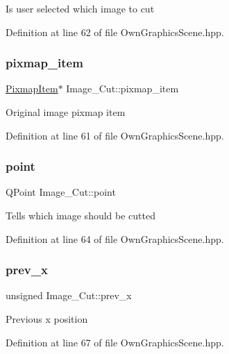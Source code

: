 Is user selected which image to cut 

Definition at line 62 of file Own\+Graphics\+Scene.\+hpp.

\mbox{\label{structImage__Cut_afdafc46c968b35b63758d409ef863a8f}} 
\subsubsection{\texorpdfstring{pixmap\+\_\+item}{pixmap\_item}}
{\footnotesize\ttfamily \mbox{\hyperlink{classPixmapItem}{Pixmap\+Item}}$\ast$ Image\+\_\+\+Cut\+::pixmap\+\_\+item}

Original image pixmap item 

Definition at line 61 of file Own\+Graphics\+Scene.\+hpp.

\mbox{\label{structImage__Cut_a45fc996285a5ae8ef255d66655d63df2}} 
\subsubsection{\texorpdfstring{point}{point}}
{\footnotesize\ttfamily Q\+Point Image\+\_\+\+Cut\+::point}

Tells which image should be cutted 

Definition at line 64 of file Own\+Graphics\+Scene.\+hpp.

\mbox{\label{structImage__Cut_a9e6768e7bea9a60876d086d78da3c4df}} 
\subsubsection{\texorpdfstring{prev\+\_\+x}{prev\_x}}
{\footnotesize\ttfamily unsigned Image\+\_\+\+Cut\+::prev\+\_\+x}

Previous x position 

Definition at line 67 of file Own\+Graphics\+Scene.\+hpp.

\mbox{\label{structImage__Cut_ad86dabb21b97270448d8db5aa7a5676f}} 

